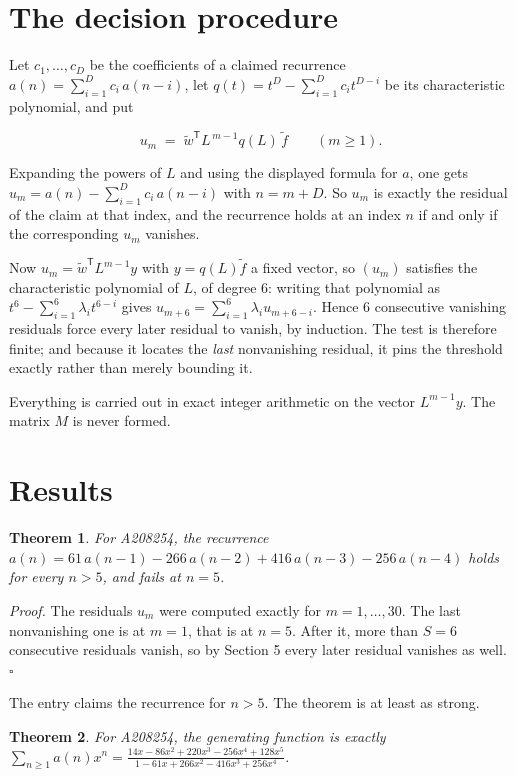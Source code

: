 \documentclass[11pt]{article}
\newtheorem{theorem}{Theorem}
\theoremstyle{definition}
\begin{document}
\section{The decision procedure}

Let $c_1,\dots,c_D$ be the coefficients of a claimed recurrence $a(n) = \sum_{i=1}^{D} c_i\,a(n-i)$, let $q(t) = t^{D} - \sum_{i=1}^{D} c_i t^{D-i}$ be its characteristic polynomial, and put

\[u_m \;=\; \tilde w^{\mathsf T} L^{\,m-1} q(L)\,\tilde f \qquad (m \ge 1).\]

Expanding the powers of $L$ and using the displayed formula for $a$, one gets $u_m = a(n) - \sum_{i=1}^{D} c_i\,a(n-i)$ with $n = m + D$. So $u_m$ is exactly the residual of the claim at that index, and the recurrence holds at an index $n$ if and only if the corresponding $u_m$ vanishes.

Now $u_m = \tilde w^{\mathsf T} L^{m-1} y$ with $y = q(L)\tilde f$ a fixed vector, so $(u_m)$ satisfies the characteristic polynomial of $L$, of degree $6$: writing that polynomial as $t^{6} - \sum_{i=1}^{6} \lambda_i t^{6-i}$ gives $u_{m+6} = \sum_{i=1}^{6} \lambda_i u_{m+6-i}$. Hence $6$ consecutive vanishing residuals force every later residual to vanish, by induction. The test is therefore finite; and because it locates the {\itshape last} nonvanishing residual, it pins the threshold exactly rather than merely bounding it.

Everything is carried out in exact integer arithmetic on the vector $L^{m-1}y$. The matrix $M$ is never formed.

\section{Results}

\begin{theorem} For A208254, the recurrence $a(n) = 61\,a(n-1) - 266\,a(n-2) + 416\,a(n-3) - 256\,a(n-4)$ holds for every $n > 5$, and fails at $n = 5$.\end{theorem}

{\itshape Proof.} The residuals $u_m$ were computed exactly for $m = 1,\dots,30$. The last nonvanishing one is at $m = 1$, that is at $n = 5$. After it, more than $S = 6$ consecutive residuals vanish, so by Section 5 every later residual vanishes as well. $\square$

The entry claims the recurrence for $n > 5$. The theorem is at least as strong.

\begin{theorem} For A208254, the generating function is exactly $\sum_{n\ge 1} a(n)x^n = \frac{14x - 86x^{2} + 220x^{3} - 256x^{4} + 128x^{5}}{1 - 61x + 266x^{2} - 416x^{3} + 256x^{4}}$.\end{theorem}
\end{document}
